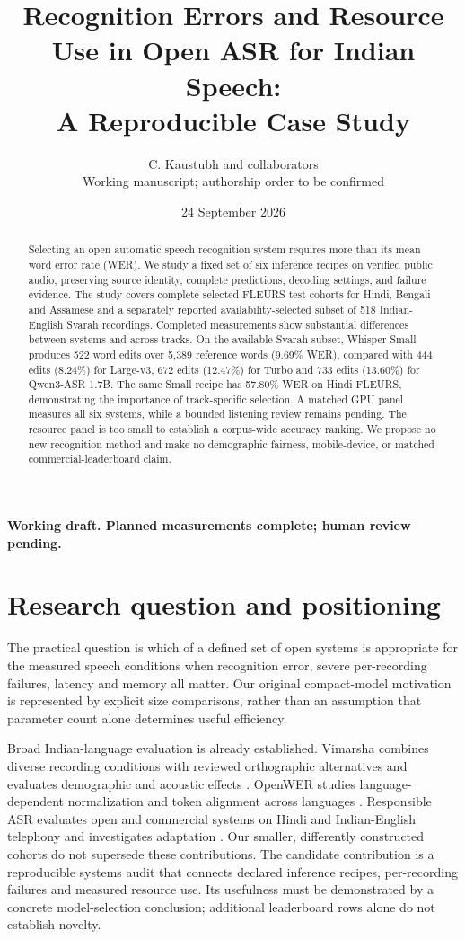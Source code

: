 \documentclass[11pt]{article}
\title{Recognition Errors and Resource Use in Open ASR for Indian Speech:\\A Reproducible Case Study}
\author{C. Kaustubh and collaborators\\Working manuscript; authorship order to be confirmed}
\date{24 September 2026}
\begin{document}
\maketitle
\begin{center}\textbf{Working draft. Planned measurements complete; human review pending.}\end{center}
\begin{abstract}
Selecting an open automatic speech recognition system requires more than its mean word error rate (WER). We study a fixed set of six inference recipes on verified public audio, preserving source identity, complete predictions, decoding settings, and failure evidence. The study covers complete selected FLEURS test cohorts for Hindi, Bengali and Assamese and a separately reported availability-selected subset of 518 Indian-English Svarah recordings. Completed measurements show substantial differences between systems and across tracks. On the available Svarah subset, Whisper Small produces 522 word edits over 5,389 reference words (9.69\% WER), compared with 444 edits (8.24\%) for Large-v3, 672 edits (12.47\%) for Turbo and 733 edits (13.60\%) for Qwen3-ASR 1.7B. The same Small recipe has 57.80\% WER on Hindi FLEURS, demonstrating the importance of track-specific selection. A matched GPU panel measures all six systems, while a bounded listening review remains pending. The resource panel is too small to establish a corpus-wide accuracy ranking. We propose no new recognition method and make no demographic fairness, mobile-device, or matched commercial-leaderboard claim.
\end{abstract}

\section{Research question and positioning}
The practical question is which of a defined set of open systems is appropriate for the measured speech conditions when recognition error, severe per-recording failures, latency and memory all matter. Our original compact-model motivation is represented by explicit size comparisons, rather than an assumption that parameter count alone determines useful efficiency.

Broad Indian-language evaluation is already established. Vimarsha combines diverse recording conditions with reviewed orthographic alternatives and evaluates demographic and acoustic effects \citep{vimarsha}. OpenWER studies language-dependent normalization and token alignment across languages \citep{openwer}. Responsible ASR evaluates open and commercial systems on Hindi and Indian-English telephony and investigates adaptation \citep{responsible}. Our smaller, differently constructed cohorts do not supersede these contributions. The candidate contribution is a reproducible systems audit that connects declared inference recipes, per-recording failures and measured resource use. Its usefulness must be demonstrated by a concrete model-selection conclusion; additional leaderboard rows alone do not establish novelty.
\end{document}

